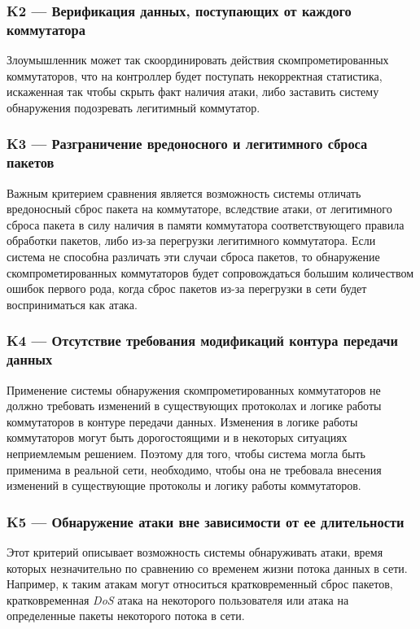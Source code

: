 \documentclass[../thesis.tex]{subfiles}
\begin{document}
\subsubsection{K2 --- Верификация данных, поступающих от каждого коммутатора} \label{criterion:K2}

Злоумышленник может так скоординировать действия скомпрометированных коммутаторов, что на контроллер будет поступать некорректная статистика, искаженная так чтобы скрыть факт наличия атаки, либо заставить систему обнаружения подозревать легитимный коммутатор.

\subsubsection{K3 --- Разграничение вредоносного и легитимного сброса пакетов} \label{criterion:K3}

Важным критерием сравнения является возможность системы отличать вредоносный сброс пакета на коммутаторе, вследствие атаки, от легитимного сброса пакета в силу наличия в памяти коммутатора соответствующего правила обработки пакетов, либо из-за перегрузки легитимного коммутатора.
Если система не способна различать эти случаи сброса пакетов, то обнаружение скомпрометированных коммутаторов будет сопровождаться большим количеством ошибок первого рода, когда сброс пакетов из-за перегрузки в сети будет восприниматься как атака.

\subsubsection{K4 --- Отсутствие требования модификаций контура передачи данных} \label{criterion:K4}

Применение системы обнаружения скомпрометированных коммутаторов не должно требовать изменений в существующих протоколах и логике работы коммутаторов в контуре передачи данных.
Изменения в логике работы коммутаторов могут быть дорогостоящими и в некоторых ситуациях неприемлемым решением.
Поэтому для того, чтобы система могла быть применима в реальной сети, необходимо, чтобы она не требовала внесения изменений в существующие протоколы и логику работы коммутаторов.

\subsubsection{K5 --- Обнаружение атаки вне зависимости от ее длительности} \label{criterion:K5}

Этот критерий описывает возможность системы обнаруживать атаки, время которых незначительно по сравнению со временем жизни потока данных в сети.
Например, к таким атакам могут относиться кратковременный сброс пакетов, кратковременная \textit{DoS} атака на некоторого пользователя или атака на определенные пакеты некоторого потока в сети.
\end{document}
